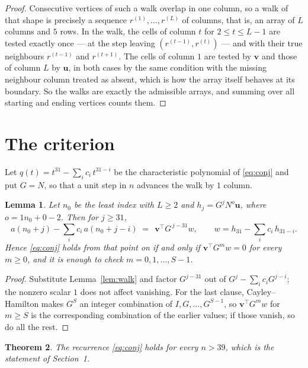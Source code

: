 \documentclass[11pt,a4paper]{article}
\theoremstyle{plain}
\newtheorem{theorem}{Theorem}
\newtheorem{lemma}[theorem]{Lemma}
\theoremstyle{definition}
\begin{document}
\begin{proof}
Consecutive vertices of such a walk overlap in one column, so a walk of that shape is
precisely a sequence $r^{(1)},\dots,r^{(L)}$ of columns, that is, an array of $L$ columns
and $5$ rows. In the walk, the cells of column $t$ for $2\le t\le L-1$ are tested
exactly once --- at the step leaving $(r^{(t-1)},r^{(t)})$ --- and with their true
neighbours $r^{(t-1)}$ and $r^{(t+1)}$. The cells of column $1$ are tested by
$\mathbf{v}$ and those of column $L$ by $\mathbf{u}$, in both cases by the same condition
with the missing neighbour column treated as absent, which is how the array itself behaves at
its boundary. So the walks are exactly the admissible arrays, and summing over all starting
and ending vertices counts them.
\end{proof}

\section{The criterion}

Let $q(t)=t^{31}-\sum_i c_i\,t^{31-i}$ be the characteristic polynomial of
\eqref{eq:conj} and put $G=N$, so that a unit step in $n$ advances the walk by
$1$ column.

\begin{lemma}\label{lem:crit}
Let $n_0$ be the least index with $L\ge2$ and $h_j=G^{j}N^{o}\mathbf{u}$, where
$o=1n_0+0-2$. Then for $j\ge31$,
\[
a(n_0+j)-\sum_i c_i\,a(n_0+j-i)\;=\;\,\mathbf{v}^{\!\top}G^{\,j-31}w,
\qquad w=h_{31}-\sum_i c_i\,h_{31-i} .
\]
Hence \eqref{eq:conj} holds from that point on if and only if
$\mathbf{v}^{\!\top}G^{m}w=0$ for every $m\ge0$, and it is enough to check
$m=0,1,\dots,S-1$.
\end{lemma}

\begin{proof}
Substitute Lemma~\ref{lem:walk} and factor $G^{j-31}$ out of
$G^{j}-\sum_ic_iG^{j-i}$; the nonzero scalar $1$ does not affect
vanishing. For the last clause, Cayley--Hamilton makes $G^{S}$ an integer combination of
$I,G,\dots,G^{S-1}$, so $\mathbf{v}^{\!\top}G^{m}w$ for $m\ge S$ is the corresponding
combination of the earlier values; if those vanish, so do all the rest.
\end{proof}

\begin{theorem}
The recurrence \eqref{eq:conj} holds for every $n>39$, which is the statement of
Section~1.
\end{theorem}
\end{document}
